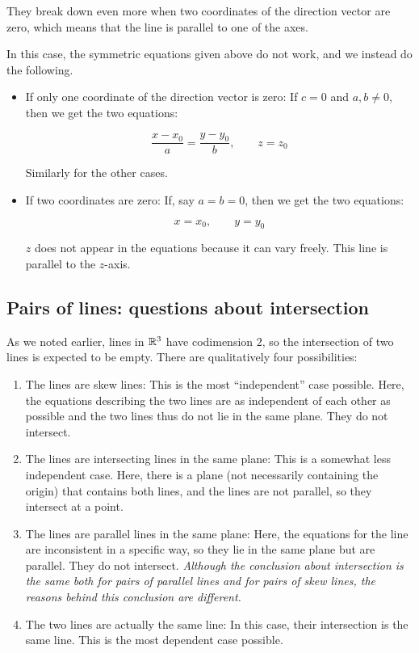 \documentclass[10pt]{amsart}
\begin{document}
They break down even more when two coordinates of the direction vector
are zero, which means that the line is parallel to one of the axes.

In this case, the symmetric equations given above do not work, and we
instead do the following.

\begin{itemize}
\item If only one coordinate of the direction vector is zero: If $c =
  0$ and $a,b \ne 0$, then we get the two equations:

  $$\frac{x - x_0}{a} = \frac{y - y_0}{b}, \qquad z = z_0$$

  Similarly for the other cases.
\item If two coordinates are zero: If, say $a = b = 0$, then we get
  the two equations:

  $$x = x_0, \qquad y = y_0$$

  $z$ does not appear in the equations because it can vary
  freely. This line is parallel to the $z$-axis.
\end{itemize}

\subsection{Pairs of lines: questions about intersection}

As we noted earlier, lines in $\mathbb{R}^3$ have codimension $2$, so the
intersection of two lines is expected to be empty. There are
qualitatively four possibilities:

\begin{enumerate}
\item The lines are skew lines: This is the most ``independent'' case
  possible. Here, the equations describing the two lines are as
  independent of each other as possible and the two lines thus do not
  lie in the same plane. They do not intersect.
\item The lines are intersecting lines in the same plane: This is a
  somewhat less independent case. Here, there is a plane (not
  necessarily containing the origin) that contains both lines, and the
  lines are not parallel, so they intersect at a point.
\item The lines are parallel lines in the same plane: Here, the
  equations for the line are inconsistent in a specific way, so they
  lie in the same plane but are parallel. They do not intersect. {\em
  Although the conclusion about intersection is the same both for
  pairs of parallel lines and for pairs of skew lines, the reasons
  behind this conclusion are different.}
\item The two lines are actually the same line: In this case, their
  intersection is the same line. This is the most dependent case
  possible.
\end{enumerate}
\end{document}
